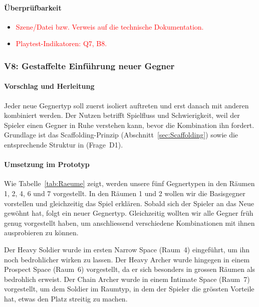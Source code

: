 \documentclass[../Main.tex]{subfiles}
\begin{document}
\paragraph{Überprüfbarkeit}
\begin{itemize}[leftmargin=1.5cm]
    \item \textcolor{red}{Szene/Datei bzw. Verweis auf die technische Dokumentation.}
    \item \textcolor{red}{Playtest-Indikatoren: Q7, B8.}
\end{itemize}

\subsubsection{V8: Gestaffelte Einführung neuer Gegner} \label{sec:V8}

\paragraph{Vorschlag und Herleitung}
Jeder neue Gegnertyp soll zuerst isoliert auftreten und erst danach mit anderen kombiniert werden. Der Nutzen betrifft Spielfluss und Schwierigkeit, weil der Spieler einen Gegner in Ruhe verstehen kann, bevor die Kombination ihn fordert. Grundlage ist das Scaffolding-Prinzip (Abschnitt~\ref{sec:Scaffolding}) sowie die entsprechende Struktur in  (Frage~D1).

\paragraph{Umsetzung im Prototyp}
Wie Tabelle~\ref{tab:Raeume} zeigt, werden unsere fünf Gegnertypen in den Räumen 1, 2, 4, 6 und 7 vorgestellt. In den Räumen 1 und 2 wollen wir die Basisgegner vorstellen und gleichzeitig das Spiel erklären. Sobald sich der Spieler an das Neue gewöhnt hat, folgt ein neuer Gegnertyp. Gleichzeitig wollten wir alle Gegner früh genug vorgestellt haben, um anschliessend verschiedene Kombinationen mit ihnen ausprobieren zu können.

Der Heavy Soldier wurde im ersten Narrow Space (Raum~4) eingeführt, um ihn noch bedrohlicher wirken zu lassen. Der Heavy Archer wurde hingegen in einem Prospect Space (Raum~6) vorgestellt, da er sich besonders in grossen Räumen als bedrohlich erweist. Der Chain Archer wurde in einem Intimate Space (Raum~7) vorgestellt, um dem Soldier im Raumtyp, in dem der Spieler die grössten Vorteile hat, etwas den Platz streitig zu machen.
\end{document}

